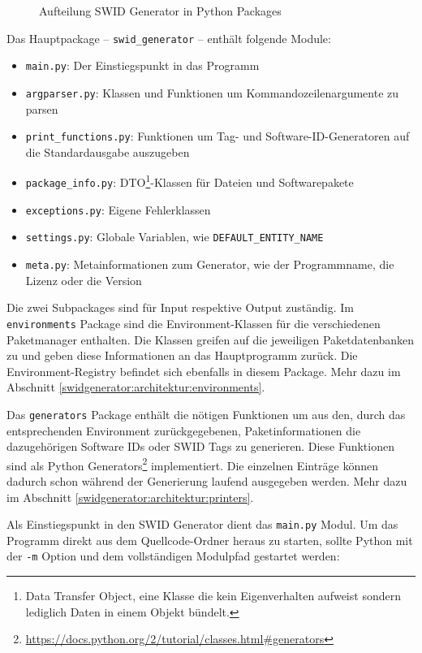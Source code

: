 \begin{figure}[H]
	\centering
	
	\caption{Aufteilung SWID Generator in Python Packages}
\end{figure}

Das Hauptpackage -- \texttt{swid\_generator} -- enthält folgende Module:

\begin{itemize}
	\item \texttt{main.py}: Der Einstiegspunkt in das Programm
	\item \texttt{argparser.py}: Klassen und Funktionen um
		Kommandozeilenargumente zu parsen
	\item \texttt{print\_functions.py}: Funktionen um Tag- und
		Software-ID-Generatoren auf die Standardausgabe auszugeben
	\item \texttt{package\_info.py}: DTO\footnote{Data Transfer Object, eine
		Klasse die kein Eigenverhalten aufweist sondern lediglich Daten in
		einem Objekt bündelt.}-Klassen für Dateien und Softwarepakete
	\item \texttt{exceptions.py}: Eigene Fehlerklassen
	\item \texttt{settings.py}: Globale Variablen, wie \zb
		\texttt{DEFAULT\_ENTITY\_NAME}
	\item \texttt{meta.py}: Metainformationen zum Generator, wie \zb der
		Programmname, die Lizenz oder die Version
\end{itemize}

Die zwei Subpackages sind für Input respektive Output zuständig. Im
\texttt{environments} Package sind die Environment-Klassen für die verschiedenen
Paketmanager enthalten. Die Klassen greifen auf die jeweiligen Paketdatenbanken
zu und geben diese Informationen an das Hauptprogramm zurück. Die
Environment-Registry befindet sich ebenfalls in diesem Package. Mehr dazu im
Abschnitt \ref{swidgenerator:architektur:environments}.

Das \texttt{generators} Package enthält die nötigen Funktionen um aus den, durch
das entsprechenden Environment zurückgegebenen, Paketinformationen die
dazugehörigen Software IDs oder SWID Tags zu generieren. Diese Funktionen sind
als Python Generators\footnote{\url{https://docs.python.org/2/tutorial/classes.html\#generators}}
implementiert. Die einzelnen Einträge können dadurch schon während der Generierung 
laufend ausgegeben werden. Mehr dazu im Abschnitt \ref{swidgenerator:architektur:printers}.

Als Einstiegspunkt in den SWID Generator dient das \texttt{main.py} Modul. Um
das Programm direkt aus dem Quellcode-Ordner heraus zu starten, sollte Python
mit der \texttt{-m} Option und dem vollständigen Modulpfad gestartet werden:

